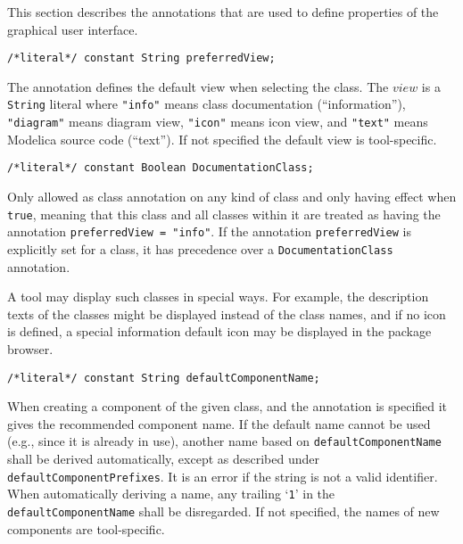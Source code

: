 This section describes the annotations that are used to define properties of the graphical user interface.

\begin{lstlisting}[language=modelica]
/*literal*/ constant String preferredView;
\end{lstlisting}

The  annotation defines the default view when selecting the class.
The $\mathit{view}$ is a \lstinline!String! literal where \lstinline!"info"! means class documentation (``information''), \lstinline!"diagram"! means diagram view, \lstinline!"icon"! means icon view, and \lstinline!"text"! means Modelica source code (``text'').
If not specified the default view is tool-specific.

\begin{lstlisting}
/*literal*/ constant Boolean DocumentationClass;
\end{lstlisting}%

Only allowed as class annotation on any kind of class and only having effect when \lstinline!true!, meaning that this class and all classes within it are treated as having the annotation \lstinline!preferredView = "info"!.
If the annotation \lstinline!preferredView! is explicitly set for a class, it has precedence over a \lstinline!DocumentationClass! annotation.

\begin{nonnormative}
A tool may display such classes in special ways.
For example, the description texts of the classes might be displayed instead of the class names, and if no icon is defined, a special information default icon may be displayed in the package browser.
\end{nonnormative}

\begin{lstlisting}[language=modelica]
/*literal*/ constant String defaultComponentName;
\end{lstlisting}%

When creating a component of the given class, and the annotation is specified it gives the recommended component name.
If the default name cannot be used (e.g., since it is already in use), another name based on \lstinline!defaultComponentName! shall be derived automatically, except as described under \lstinline!defaultComponentPrefixes!.
It is an error if the string is not a valid identifier.
When automatically deriving a name, any trailing `\lstinline!1!' in the \lstinline!defaultComponentName! shall be disregarded.
If not specified, the names of new components are tool-specific.

